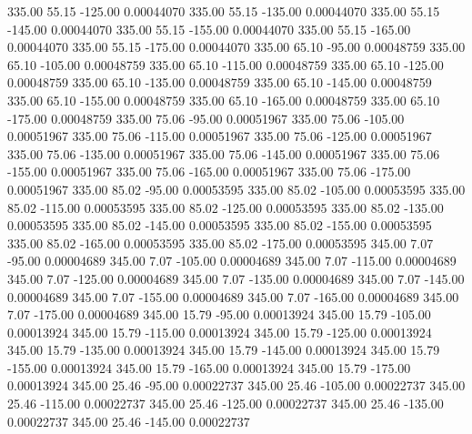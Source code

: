     335.00     55.15   -125.00     0.00044070
    335.00     55.15   -135.00     0.00044070
    335.00     55.15   -145.00     0.00044070
    335.00     55.15   -155.00     0.00044070
    335.00     55.15   -165.00     0.00044070
    335.00     55.15   -175.00     0.00044070
    335.00     65.10    -95.00     0.00048759
    335.00     65.10   -105.00     0.00048759
    335.00     65.10   -115.00     0.00048759
    335.00     65.10   -125.00     0.00048759
    335.00     65.10   -135.00     0.00048759
    335.00     65.10   -145.00     0.00048759
    335.00     65.10   -155.00     0.00048759
    335.00     65.10   -165.00     0.00048759
    335.00     65.10   -175.00     0.00048759
    335.00     75.06    -95.00     0.00051967
    335.00     75.06   -105.00     0.00051967
    335.00     75.06   -115.00     0.00051967
    335.00     75.06   -125.00     0.00051967
    335.00     75.06   -135.00     0.00051967
    335.00     75.06   -145.00     0.00051967
    335.00     75.06   -155.00     0.00051967
    335.00     75.06   -165.00     0.00051967
    335.00     75.06   -175.00     0.00051967
    335.00     85.02    -95.00     0.00053595
    335.00     85.02   -105.00     0.00053595
    335.00     85.02   -115.00     0.00053595
    335.00     85.02   -125.00     0.00053595
    335.00     85.02   -135.00     0.00053595
    335.00     85.02   -145.00     0.00053595
    335.00     85.02   -155.00     0.00053595
    335.00     85.02   -165.00     0.00053595
    335.00     85.02   -175.00     0.00053595
    345.00      7.07    -95.00     0.00004689
    345.00      7.07   -105.00     0.00004689
    345.00      7.07   -115.00     0.00004689
    345.00      7.07   -125.00     0.00004689
    345.00      7.07   -135.00     0.00004689
    345.00      7.07   -145.00     0.00004689
    345.00      7.07   -155.00     0.00004689
    345.00      7.07   -165.00     0.00004689
    345.00      7.07   -175.00     0.00004689
    345.00     15.79    -95.00     0.00013924
    345.00     15.79   -105.00     0.00013924
    345.00     15.79   -115.00     0.00013924
    345.00     15.79   -125.00     0.00013924
    345.00     15.79   -135.00     0.00013924
    345.00     15.79   -145.00     0.00013924
    345.00     15.79   -155.00     0.00013924
    345.00     15.79   -165.00     0.00013924
    345.00     15.79   -175.00     0.00013924
    345.00     25.46    -95.00     0.00022737
    345.00     25.46   -105.00     0.00022737
    345.00     25.46   -115.00     0.00022737
    345.00     25.46   -125.00     0.00022737
    345.00     25.46   -135.00     0.00022737
    345.00     25.46   -145.00     0.00022737
